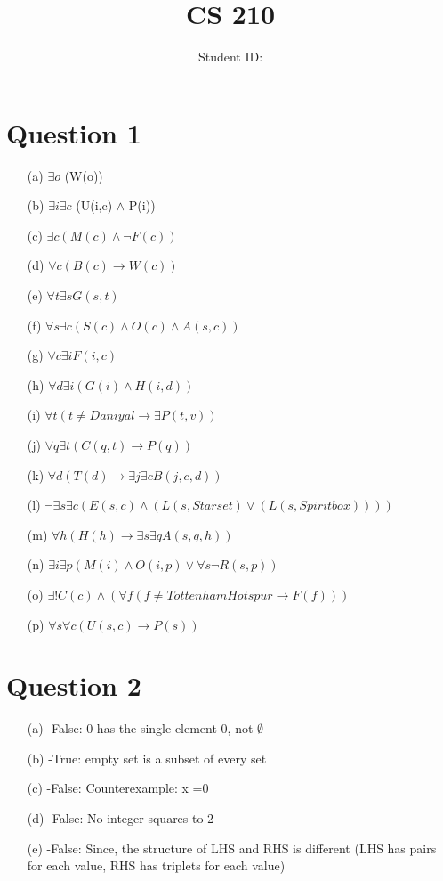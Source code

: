 \documentclass[twoside]{article}
\title{CS 210 \hwNo}
\author{\myname \qquad Student ID:\myid}
\date{\currentdate}
\begin{document}
\maketitle

\section*{Question 1}

\begin{enumerate} 
    \item[(a)] $ \exists o $ (W(o)) 
    \item[(b)] $ \exists i \exists c$ (U(i,c) $\wedge$ P(i))
    \item[(c)] $ \exists c (M(c) \wedge \neg F(c))$
    \item[(d)] $ \forall c (B(c) \rightarrow W(c))$
    \item[(e)] $ \forall t \exists s G(s,t)$
    \item[(f)] $ \forall s \exists c (S(c) \wedge O(c) \wedge A(s,c))$
    \item[(g)] $ \forall c \exists i F(i,c)$
    \item[(h)] $ \forall d \exists i (G(i) \wedge H(i,d))$
    \item[(i)] $ \forall t (t \neq Daniyal \rightarrow \exists P(t,v) )$
    \item[(j)] $ \forall q \exists t (C(q,t) \rightarrow P(q))$
    \item[(k)] $ \forall d  (T(d) \rightarrow \exists j \exists c B(j,c,d))$
    \item[(l)] $ \neg \exists s \exists c (E(s,c) \wedge (L(s, Starset) \vee (L(s, Spiritbox))))$
    \item[(m)] $ \forall h (H(h) \rightarrow \exists s \exists q A(s,q,h))$
    \item[(n)] $ \exists i \exists p (M(i) \wedge O(i,p) \vee \forall s \neg R (s,p))$
    \item[(o)]$ \exists !C(c) \wedge (\forall f (f \neq Tottenham Hotspur \rightarrow F(f)))$
    \item[(p)] $ \forall s \forall c (U(s,c) \rightarrow P(s))$
\end{enumerate}

\section*{Question 2}
\begin{enumerate}
    \item[(a)] -False: {0} has the single element 0, not $\emptyset$
    \item[(b)] -True: empty set is a subset of every set
    \item[(c)] -False: Counterexample: x =0
    \item[(d)] -False: No integer squares to 2
    \item[(e)] -False: Since, the structure of LHS and RHS is different (LHS has pairs for each value, RHS has triplets for each value) 
\end{enumerate}
\end{document}
